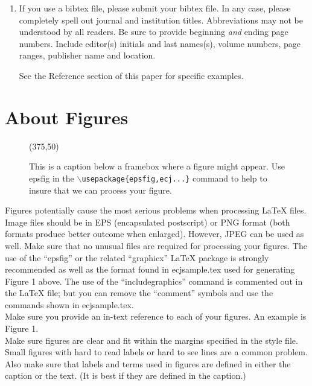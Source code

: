 \documentclass[twoside]{article}
\begin{document}
\begin{enumerate}
\item
If you use a bibtex file, please submit your bibtex file. In any case,
please completely 
spell out journal and institution titles.  Abbreviations may not be 
understood by all readers. Be sure to provide beginning {\em and} ending 
page numbers. Include editor(s) initials and last names(s), volume numbers, 
page ranges, publisher name and location.

See the Reference section of this paper for specific examples.

\end{enumerate}

\section{About Figures}

\begin{figure}[t]
\begin{center}
\centerline{
\framebox(375,50)
}
\end{center}
\caption{This is a caption below a framebox where a figure might appear.  
         Use epsfig in the {\tt $\backslash$usepackage\{epsfig,ecj...\}} 
         command to help to insure that we can process your figure.}
\label{graph1}
\end{figure}

Figures potentially cause the most serious problems when processing \LaTeX{}
files. Image files should be in EPS (encapsulated postscript) or 
PNG format (both formats produce better outcome when enlarged). However, JPEG 
can be used as well. Make sure that no unusual files are required for 
processing your figures.
The use of the ``epsfig'' or the related ``graphicx'' \LaTeX{} package is 
strongly recommended as well as the
format found in ecjsample.tex used for generating Figure 1 above.
The use of the ``includegraphics'' command is commented out in the \LaTeX{} 
file;
but you can remove the ``comment'' symbols and use the
commands shown in ecjsample.tex.\\

Make sure you provide an in-text reference to each of your figures.  An 
example is Figure 1.\\

Make sure figures are clear and fit within the margins specified in the 
style file.  Small figures with hard to read labels or hard to see lines are 
a common problem.  Also make sure that labels and terms used in figures are
defined in either the caption or the text. (It is best if they
are defined in the caption.)
\end{document}
